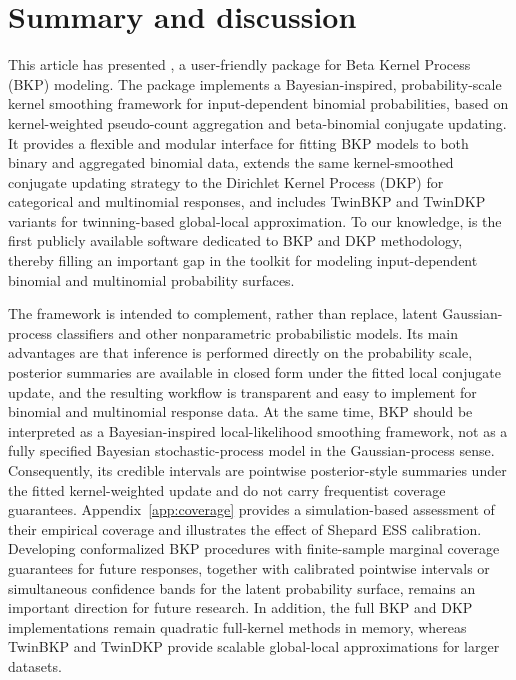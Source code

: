 \documentclass[article, shortnames]{jss}
\begin{document}
\FloatBarrier

\section{Summary and discussion} \label{sec:summary}

This article has presented , a user-friendly  package for Beta Kernel Process (BKP) modeling.
The package implements a Bayesian-inspired, probability-scale kernel smoothing framework for input-dependent binomial probabilities, based on kernel-weighted pseudo-count aggregation and beta-binomial conjugate updating.
It provides a flexible and modular interface for fitting BKP models to both binary and aggregated binomial data, extends the same kernel-smoothed conjugate updating strategy to the Dirichlet Kernel Process (DKP) for categorical and multinomial responses, and includes TwinBKP and TwinDKP variants for twinning-based global-local approximation.
To our knowledge,  is the first publicly available software dedicated to BKP and DKP methodology, thereby filling an important gap in the toolkit for modeling input-dependent binomial and multinomial probability surfaces.

The framework is intended to complement, rather than replace, latent Gaussian-process classifiers and other nonparametric probabilistic models.
Its main advantages are that inference is performed directly on the probability scale, posterior summaries are available in closed form under the fitted local conjugate update, and the resulting workflow is transparent and easy to implement for binomial and multinomial response data.
At the same time, BKP should be interpreted as a Bayesian-inspired local-likelihood smoothing framework, not as a fully specified Bayesian stochastic-process model in the Gaussian-process sense.
Consequently, its credible intervals are pointwise posterior-style summaries under the fitted kernel-weighted update and do not carry frequentist coverage guarantees. Appendix~\ref{app:coverage} provides a simulation-based assessment of their empirical coverage and illustrates the effect of Shepard ESS calibration. Developing conformalized BKP procedures with finite-sample marginal coverage guarantees for future responses, together with calibrated pointwise intervals or simultaneous confidence bands for the latent probability surface, remains an important direction for future research.
In addition, the full BKP and DKP implementations remain quadratic full-kernel methods in memory, whereas TwinBKP and TwinDKP provide scalable global-local approximations for larger datasets.
\end{document}
